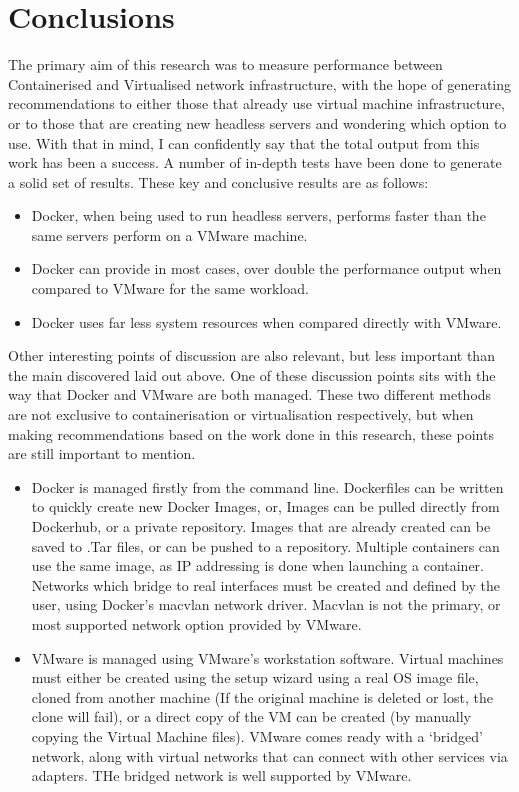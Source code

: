 \chapter{Conclusions}
The primary aim of this research was to measure performance between Containerised and Virtualised network infrastructure, with the hope of generating recommendations to either those that already use virtual machine infrastructure, or to those that are creating new headless servers and wondering which option to use.
With that in mind, I can confidently say that the total output from this work has been a success. A number of in-depth tests have been done to generate a solid set of results. These key and conclusive results are as follows:
\begin{itemize}
  \item Docker, when being used to run headless servers, performs faster than the same servers perform on a VMware machine.
  \item Docker can provide in most cases, over double the performance output when compared to VMware for the same workload.
  \item Docker uses far less system resources when compared directly with VMware.
\end{itemize}

Other interesting points of discussion are also relevant, but less important than the main discovered laid out above. One of these discussion points sits with the way that Docker and VMware are both managed. These two different methods are not exclusive to containerisation or virtualisation respectively, but when making recommendations based on the work done in this research, these points are still important to mention.
\begin{itemize}
  \item Docker is managed firstly from the command line. Dockerfiles can be written to quickly create new Docker Images, or, Images can be pulled directly from Dockerhub, or a private repository. Images that are already created can be saved to .Tar files, or can be pushed to a repository. Multiple containers can use the same image, as IP addressing is done when launching a container. Networks which bridge to real interfaces must be created and defined by the user, using Docker's macvlan network driver. Macvlan is not the primary, or most supported network option provided by VMware.
  \item VMware is managed using VMware's workstation software. Virtual machines must either be created using the setup wizard using a real OS image file, cloned from another machine (If the original machine is deleted or lost, the clone will fail), or a direct copy of the VM can be created (by manually copying the Virtual Machine files). VMware comes ready with a `bridged' network, along with virtual networks that can connect with other services via adapters. THe bridged network is well supported by VMware.
\end{itemize}

